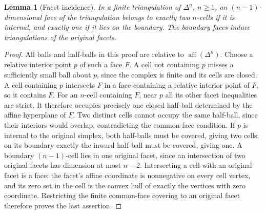 \documentclass[11pt,oneside,openany]{book}
\newtheorem{lemma}[theorem]{Lemma}
\theoremstyle{definition}
\theoremstyle{remark}
\begin{document}
\begin{lemma}[Facet incidence]\label{d10:17:incidence}
In a finite triangulation of $\Delta^n$, $n\geq1$, an
$(n-1)$-dimensional face of the triangulation belongs to exactly two
$n$-cells if it is internal, and exactly one if it lies on the boundary.
The boundary faces induce triangulations of the original facets.
\end{lemma}
\begin{proof}
All balls and half-balls in this proof are relative to
$\operatorname{aff}(\Delta^n)$. Choose a relative interior point $p$ of
such a face $F$. A cell not
containing $p$ misses a sufficiently small ball about $p$, since the
complex is finite and its cells are closed. A cell containing $p$
intersects $F$ in a face containing a relative interior point of $F$,
so it contains $F$. For an $n$-cell containing $F$, near $p$ all its
other facet inequalities are strict. It therefore occupies precisely
one closed half-ball determined by the affine hyperplane of $F$.
Two distinct cells cannot occupy the same half-ball, since their
interiors would overlap, contradicting the common-face condition.
If $p$ is internal to the original simplex, both half-balls must be
covered, giving two cells; on its boundary exactly the inward half-ball
must be covered, giving one. A boundary $(n-1)$-cell lies in one
original facet, since an intersection of two original facets has
dimension at most $n-2$. Intersecting a cell with an original facet
is a face: the facet's affine coordinate is nonnegative on every
cell vertex, and its zero set in the cell is the convex hull of exactly
the vertices with zero coordinate. Restricting the finite common-face
covering to an original facet therefore proves the last assertion.
\end{proof}
\end{document}
